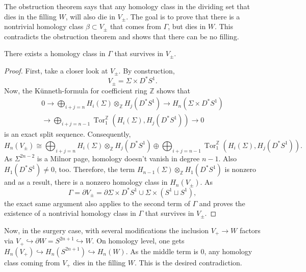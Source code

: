 The obstruction theorem says that any homology class in the dividing set that dies in the filling $W$, will also
die in $V_{\pm}$.
The goal is to prove that there is a nontrivial homology class $\beta \subset V_\pm$ that
comes from $\Gamma$, but dies in $W$. This contradicts the obstruction theorem and shows that there can be no filling.

\begin{lemma}
    There exists a homology class in $\Gamma$ that survives in $V_\pm$.
\end{lemma}
\begin{proof}
    First, take a closer look at $V_\pm$. By construction,
    \[
        V_\pm = \Sigma \times D^*S^1.
    \]
    Now, the Künneth-formula for coefficient ring $\mathbb Z$ shows that
    \begin{multline}
        0 \to \bigoplus_{i+j = n} H_i(\Sigma) \otimes_{\mathbb Z} H_j(D^* S^1) \to  H_n(\Sigma \times D^*S^1)\\
        \to \bigoplus_{i+j = n-1} \operatorname{Tor}^\mathbb{Z}_1\left(H_i(\Sigma), H_j(D^* S^1)\right) \to 0
    \end{multline}
    is an exact split sequence.
    Consequently,
    \[
        H_n(V_\pm) \cong \bigoplus_{i+j = n} H_i(\Sigma) \otimes_{\mathbb Z} H_j(D^* S^1) \oplus \bigoplus_{i+j = n-1} \operatorname{Tor}^\mathbb{Z}_1\left(H_i(\Sigma), H_j(D^* S^1)\right).
    \]
    As $\Sigma^{2n-2}$ is a Milnor page, homology doesn't vanish in degree $n-1$.
    Also $H_1(D^*S^1) \neq 0$, too. Therefore, the term $H_{n-1}(\Sigma) \otimes_{\mathbb Z} H_1(D^*S^1)$ is nonzero and as a result, 
    there is a nonzero homology class in $H_n(V_\pm)$.
    As 
    \[
        \Gamma = \partial V_\pm = \partial \Sigma \times D^*S^1 \cup \Sigma \times \left(S^1 \sqcup S^1\right),
    \]
    the exact same argument also applies to the second term of $\Gamma$ and proves the existence of a
    nontrivial homology class in $\Gamma$ that survives in $V_\pm$.
\end{proof}

Now, in the surgery case, with several modifications the inclusion
$V_+ \to W$ factors via $V_+ \hookrightarrow \partial W = S^{2n+1} \hookrightarrow W$.
On homology level, one gets
$H_n(V_+) \hookrightarrow H_n(S^{2n+1}) \hookrightarrow H_n(W)$.
As the middle term is $0$, any homology class coming from $V_+$ dies in the filling $W$.
This is the desired contradiction.